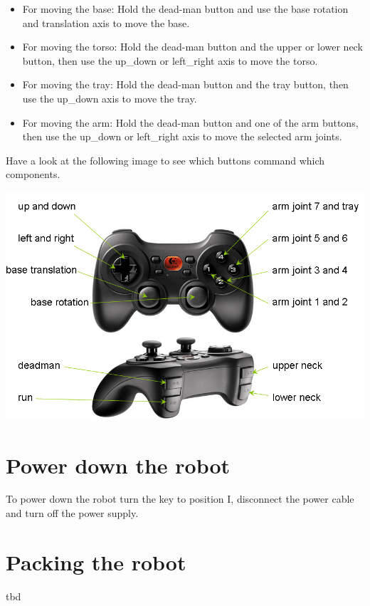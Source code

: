\begin{itemize}
\item For moving the base: Hold the dead-man button and use the base rotation and translation axis to move the base.
\item For moving the torso: Hold the dead-man button and the upper or lower neck button, then use the up\_down or left\_right axis to move the torso.
\item For moving the tray: Hold the dead-man button and the tray button, then use the up\_down axis to move the tray.
\item For moving the arm: Hold the dead-man button and one of the arm buttons, then use the up\_down or left\_right axis to move the selected arm joints.
\end{itemize}

Have a look at the following image to see which buttons command which components. 
\begin{center}
\includegraphics[width=1\textwidth]{images/joystick.png}
\end{center}

\section{Power down the robot}
To power down the robot turn the key to position I, disconnect the power cable and turn off the power supply.

\section{Packing the robot}
tbd